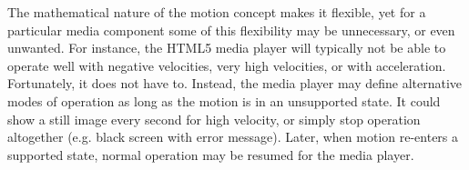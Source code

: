 The mathematical nature of the motion concept makes it flexible, yet for a
particular media component some of this flexibility may be unnecessary, or
even unwanted. For instance, the HTML5 media player will typically not be able
to operate well with negative velocities, very high velocities, or with
acceleration. Fortunately, it does not have to. Instead, the media player may
define alternative modes of operation as long as the motion is in an
unsupported state. It could show a still image every second for high velocity,
or simply stop operation altogether (e.g. black screen with error message).
Later, when motion re-enters a supported state, normal operation may be
resumed for the media player.

